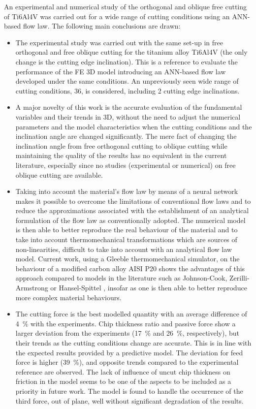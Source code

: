 \documentclass[preprint,12pt,times]{elsarticle}
\begin{document}
An experimental and numerical study of the orthogonal and oblique free cutting of Ti6Al4V was carried out for a wide range of cutting conditions using an ANN-based flow law. The following main conclusions are drawn:
\begin{itemize}
  \item The experimental study was carried out with the same set-up in free orthogonal and free oblique cutting for the titanium alloy Ti6Al4V (the only change is the cutting edge inclination). This is a reference to evaluate the performance of the FE 3D model introducing an ANN-based flow law developed under the same conditions. An unpreviously seen wide range of cutting conditions, 36, is considered, including 2 cutting edge inclinations.
  \item A major novelty of this work is the accurate evaluation of the fundamental variables and their trends in 3D, without the need to adjust the numerical parameters and the model characteristics when the cutting conditions and the inclination angle are changed significantly. The mere fact of changing the inclination angle from free orthogonal cutting to oblique cutting while maintaining the quality of the results has no equivalent in the current literature, especially since no studies (experimental or numerical) on free oblique cutting are available.
  \item Taking into account the material's flow law by means of a neural network makes it possible to overcome the limitations of conventional flow laws and to reduce the approximations associated with the establishment of an analytical formulation of the flow law as conventionally adopted. The numerical model is then able to better reproduce the real behaviour of the material and to take into account thermomechanical transformations which are sources of non-linearities, difficult to take into account with an analytical flow law model. Current work, using a Gleeble thermomechanical simulator, on the behaviour of a modified carbon alloy AISI P20 shows the advantages of this approach compared to models in the literature such as Johnson-Cook, Zerilli-Armstrong \cite{Muralli-2017-Performance} or Hansel-Spittel \cite{chadha2018approach}, insofar as one is then able to better reproduce more complex material behaviours.
  \item The cutting force is the best modelled quantity with an average difference of \qty{4}{\%} with the experiments. Chip thickness ratio and passive force show a larger deviation from the experiments (\qty{17}{\%} and \qty{26}{\%}, respectively), but their trends as the cutting conditions change are accurate. This is in line with the expected results provided by a predictive model. The deviation for feed force is higher (\qty{39}{\%}), and opposite trends compared to the experimental reference are observed. The lack of influence of uncut chip thickness on friction in the model seems to be one of the aspects to be included as a priority in future work. The model is found to handle the occurrence of the third force, out of plane, well without significant degradation of the results.

\end{itemize}
\end{document}
